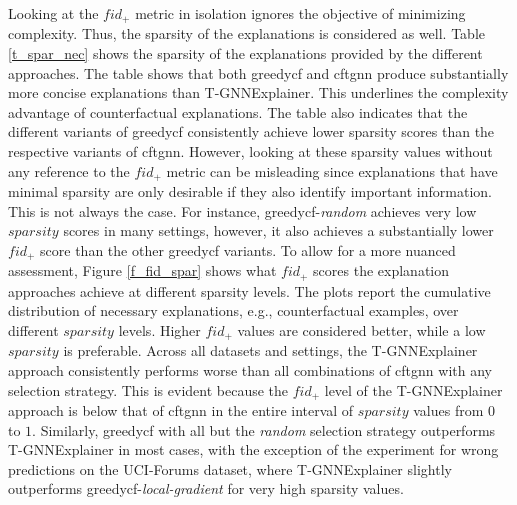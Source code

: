 Looking at the $fid_+$ metric in isolation ignores the objective of minimizing complexity. Thus, the sparsity of the explanations is considered as well. Table \ref{t_spar_nec} shows the sparsity of the explanations provided by the different approaches. The table shows that both \gls{greedycf} and \gls{cftgnn} produce substantially more concise explanations than T-GNNExplainer. This underlines the complexity advantage of counterfactual explanations. The table also indicates that the different variants of \gls{greedycf} consistently achieve lower sparsity scores than the respective variants of \gls{cftgnn}. However, looking at these sparsity values without any reference to the $fid_+$ metric can be misleading since explanations that have minimal sparsity are only desirable if they also identify important information. This is not always the case. For instance, \gls{greedycf}-\textit{random} achieves very low $sparsity$ scores in many settings, however, it also achieves a substantially lower $fid_+$ score than the other \gls{greedycf} variants. To allow for a more nuanced assessment, Figure \ref{f_fid_spar} shows what $fid_+$ scores the explanation approaches achieve at different sparsity levels. The plots report the cumulative distribution of necessary explanations, e.g., counterfactual examples, over different $sparsity$ levels. Higher $fid_+$ values are considered better, while a low $sparsity$ is preferable. Across all datasets and settings, the T-GNNExplainer approach consistently performs worse than all combinations of \gls{cftgnn} with any selection strategy. This is evident because the $fid_+$ level of the T-GNNExplainer approach is below that of \gls{cftgnn} in the entire interval of $sparsity$ values from $0$ to $1$. Similarly, \gls{greedycf} with all but the \textit{random} selection strategy outperforms T-GNNExplainer in most cases, with the exception of the experiment for wrong predictions on the UCI-Forums dataset, where T-GNNExplainer slightly outperforms \gls{greedycf}-\textit{local-gradient} for very high sparsity values.

